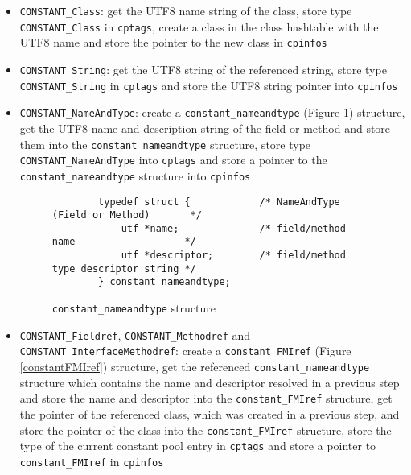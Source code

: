 \begin{itemize}
 \item \texttt{CONSTANT\_Class}: get the UTF8 name string of the
 class, store type \texttt{CONSTANT\_Class} in \texttt{cptags}, create
 a class in the class hashtable with the UTF8 name and store the
 pointer to the new class in \texttt{cpinfos}

 \item \texttt{CONSTANT\_String}: get the UTF8 string of the
 referenced string, store type \texttt{CONSTANT\_String} in
 \texttt{cptags} and store the UTF8 string pointer into
 \texttt{cpinfos}

 \begingroup
 \item \texttt{CONSTANT\_NameAndType}: create a
 \texttt{constant\_nameandtype} (Figure \ref{constantnameandtype})
 structure, get the UTF8 name and description string of the field or
 method and store them into the \texttt{constant\_nameandtype}
 structure, store type \texttt{CONSTANT\_NameAndType} into
 \texttt{cptags} and store a pointer to the
 \texttt{constant\_nameandtype} structure into \texttt{cpinfos}

 \endgroup

\begin{figure}[h]
\begin{verbatim}
        typedef struct {            /* NameAndType (Field or Method)       */
            utf *name;              /* field/method name                   */
            utf *descriptor;        /* field/method type descriptor string */
        } constant_nameandtype;
\end{verbatim}
\caption{\texttt{constant\_nameandtype} structure}
\label{constantnameandtype}
\end{figure}

 \begingroup
 \item \texttt{CONSTANT\_Fieldref}, \texttt{CONSTANT\_Methodref} and
 \texttt{CONSTANT\_InterfaceMethodref}: create a
 \texttt{constant\_FMIref} (Figure \ref{constantFMIref}) structure,
 get the referenced \texttt{constant\_nameandtype} structure which
 contains the name and descriptor resolved in a previous step and
 store the name and descriptor into the \texttt{constant\_FMIref}
 structure, get the pointer of the referenced class, which was created
 in a previous step, and store the pointer of the class into the
 \texttt{constant\_FMIref} structure, store the type of the current
 constant pool entry in \texttt{cptags} and store a pointer to
 \texttt{constant\_FMIref} in \texttt{cpinfos}


\end{itemize}
